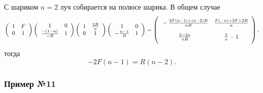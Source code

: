 С шариком $n=2$ луч собирается на полюсе шарика. В общем случае
\begin{equation*}
    \left(
    \begin{array}{cc}
     1 & F \\
     0 & 1 \\
    \end{array}
    \right)
    \left(
    \begin{array}{cc}
     1 & 0 \\
     \frac{-(1-n)}{-R} & 1 \\
    \end{array}
    \right)
    \left(
    \begin{array}{cc}
     1 & \frac{2 R}{n} \\
     0 & 1 \\
    \end{array}
    \right)
    \left(
    \begin{array}{cc}
     1 & 0 \\
     -\frac{n-1}{R} & 1 \\
    \end{array}
    \right) = 
    \left(
    \begin{array}{cc}
     \vphantom{\bigg|}
     -\frac{2 F (n-1)+(n-2) R}{n R} & \frac{F (-n)+2 F+2 R}{n} \\
     \vphantom{\bigg|}
     \frac{2-2 n}{n R} & \frac{2}{n}-1 \\
    \end{array}
    \right),
\end{equation*}
тогда
\begin{equation*}
    - 2 F (n-1) = R (n-2).
\end{equation*}


\subsubsection*{Пример №11}


